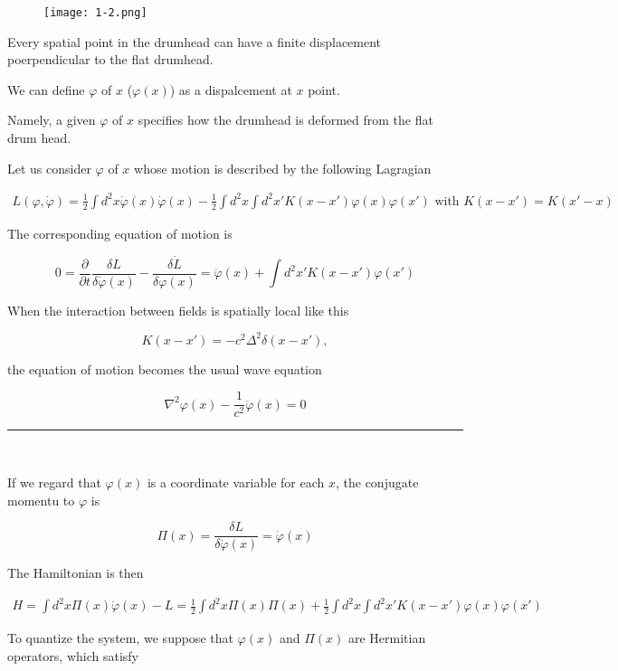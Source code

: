 ﻿\documentclass[twoside]{book}
\numberwithin{equation}{section}
\begin{document}
\begin{figure}[h]
\texttt{[image: 1-2.png]}
\end{figure}

Every spatial point in the drumhead can have a finite displacement poerpendicular to the flat drumhead. 

We can define $\varphi$ of $x$ ($\varphi(x)$) as a dispalcement at $x$ point. 

Namely, a given $\varphi$ of $x$ specifies how the drumhead is deformed from the flat drum head. 

Let us consider $\varphi$ of $x$ whose motion is described by the following Lagragian

\begin{align}
L(\varphi,\dot{\varphi}) = \frac{1}{2}\int d^2 x\dot{\varphi}(x)\dot{\varphi}(x) - \frac{1}{2}\int d^2 x \int d^2 x' K(x-x')\varphi(x)\varphi(x')\text{ with }K(x-x') = K(x'-x)
\end{align}

The corresponding equation of motion is

\begin{equation}
0 = \frac{\partial}{\partial t}\frac{\delta L}{\delta \dot{\varphi}(x)} - \frac{\delta\dot{L}}{\delta \varphi(x)} = \ddot{\varphi}(x)+\int d^2 x' K(x-x')\varphi(x')
\end{equation}

When the interaction between fields is spatially local like this

\[K(x-x') = -c^2\Delta^2\delta(x-x'), \]

the equation of motion becomes the usual wave equation

\[\nabla^2\varphi(x) - \frac{1}{c^2}\ddot{\varphi}(x) = 0 \]

\hrule

\ 

If we regard that $\varphi(x)$ is a coordinate variable for each $x$, the conjugate momentu to $\varphi$ is

\[\Pi(x) = \frac{\delta L}{\delta \dot{\varphi}(x)} = \dot{\varphi}(x) \]

The Hamiltonian is then 

\begin{align}
H = \int d^2 x \Pi(x) \dot{\varphi}(x) - L = \frac{1}{2}\int d^2 x \Pi(x)\Pi(x)+\frac{1}{2}\int d^2 x \int d^2 x' K(x-x') \varphi(x)\varphi(x')
\end{align}

To quantize the system, we suppose that $\varphi(x)$ and $\Pi(x)$ are Hermitian operators, which satisfy
\end{document}
